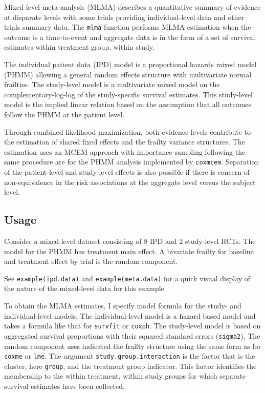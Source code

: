 Mixed-level meta-analysis (MLMA) describes a quantitative summary of
evidence at disparate levels with some trials providing
individual-level data and other trials summary data. The \texttt{mlma}
function performs MLMA estimation when the outcome is a time-to-event
and aggregate data is in the form of a set of survival estimates
within treatment group, within study. 

The individual patient data (IPD) model is a proportional hazards
mixed model (PHMM) allowing a general random effects structure with multivariate normal
frailties. The study-level model is a multivariate mixed model on the
complementary-log-log of the study-specific survival estimates. This
study-level model is the implied linear relation based on the
assumption that all outcomes follow the PHMM at the patient level. 

Through
combined likelihood maximization, both evidence levels contribute to
the estimation of shared fixed effects and the frailty variance
structures. The estimation uses an MCEM approach with importance
sampling following the same procedure are for the PHMM analysis
implemented by \texttt{coxmcem}. Separation of the patient-level and study-level effects is
also possible if there is concern of non-equivalence in the risk
associations at the aggregate level versus the subject level.

\subsection{Usage}

Consider a mixed-level dataset consisting of 8 IPD and 2
study-level RCTs. The model for the PHMM has treatment main effect. A bivariate frailty
for baseline and treatment effect by trial is the random component.

See \texttt{example(ipd.data)} and \texttt{example(meta.data)} for a
quick visual display of the nature of the mixed-level data for this
example.

To obtain the MLMA estimates, I specify model formula for the study- and
individual-level models. The individual-level model is a hazard-based
model and takes a formula like that for \texttt{survfit} or \texttt{coxph}.
The study-level model is based on aggregated survival proportions with
their squared standard errors (\texttt{sigma2}). The random component
uses indicated the frailty structure using the same form as for
\texttt{coxme} or \texttt{lme}. The argument
\texttt{study.group.interaction} is the factor that is the
cluster, here \texttt{group}, and the treatment group indicator. This
factor identifies the membership to the within treatment, within study
groups for which separate survival estimates have been collected. 

